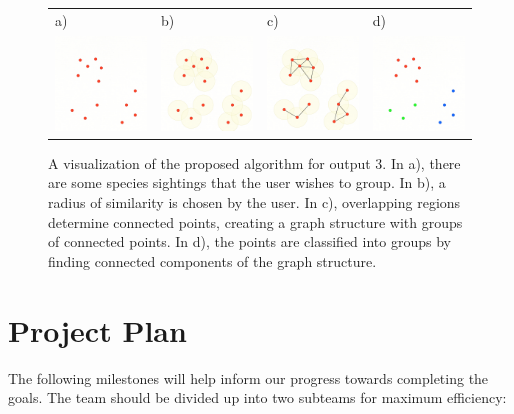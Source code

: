 \documentclass{article}
\begin{document}
\begin{figure}[t]
\centering
\begin{tabular}{ p{32mm}p{32mm}p{32mm}p{32mm} }
a) & b) & c) & d)\\
\includegraphics[width=35mm,frame=0.01cm]{Fig.png} & \includegraphics[width=35mm,frame=0.01cm]{Fig2.png} & \includegraphics[width=35mm,frame=0.01cm]{Fig3.png} & \includegraphics[width=35mm,frame=0.01cm]{Fig4.png}
\end{tabular}
\caption{A visualization of the proposed algorithm for output 3. In a), there are some species sightings that the user wishes to group. In b), a radius of similarity is chosen by the user. In c), overlapping regions determine connected points, creating a graph structure with groups of connected points. In d), the points are classified into groups by finding connected components of the graph structure. }
\label{fig:Groupings}
\end{figure}

\clearpage
\section{Project Plan}
The following milestones will help inform our progress towards completing the goals. The team should be divided up into two subteams for maximum efficiency:
\end{document}
